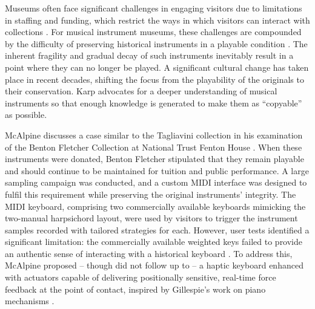 




Museums often face significant challenges in engaging visitors due to limitations in staffing and funding, which restrict the ways in which visitors can interact with collections \cite{Templeton2018, McAlpine2014}. For musical instrument museums, these challenges are compounded by the difficulty of preserving historical instruments in a playable condition \cite{McAlpine2014}. The inherent fragility and gradual decay of such instruments inevitably result in a point where they can no longer be played. A significant cultural change has taken place in recent decades, shifting the focus from the playability of the originals to their conservation. Karp \cite{Karp1979,Karp1985} advocates for a deeper understanding of musical instruments so that enough knowledge is generated to make them as ``copyable'' as possible.

McAlpine discusses a case similar to the Tagliavini collection in his examination of the Benton Fletcher Collection at National Trust Fenton House \cite{McAlpine2014}. When these instruments were donated, Benton Fletcher stipulated that they remain playable and should continue to be maintained for tuition and public performance. A large sampling campaign was conducted, and a custom MIDI interface was designed to fulfil this requirement while preserving the original instruments' integrity. The MIDI keyboard, comprising two commercially available keyboards mimicking the two-manual harpsichord layout, were used by visitors to trigger the instrument samples recorded with tailored strategies for each. However, user tests identified a significant limitation: the commercially available weighted keys failed to provide an authentic sense of interacting with a historical keyboard \cite{McAlpine2014}. To address this, McAlpine proposed -- though did not follow up to -- a haptic keyboard enhanced with actuators capable of delivering positionally sensitive, real-time force feedback at the point of contact, inspired by Gillespie’s work on piano mechanisms \cite{Gillespie1996}.


